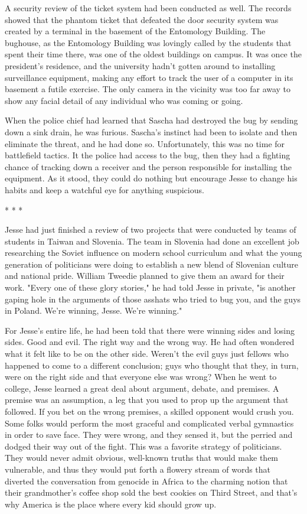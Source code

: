 A security review of the ticket system had been conducted as well.  The records showed that the phantom ticket that defeated the door security system was created by a terminal in the basement of the Entomology Building.  The bughouse, as the Entomology Building was lovingly called by the students that spent their time there, was one of the oldest buildings on campus.  It was once the president's residence, and the university hadn't gotten around to installing surveillance equipment, making any effort to track the user of a computer in its basement a futile exercise.  The only camera in the vicinity was too far away to show any facial detail of any individual who was coming or going.

When the police chief had learned that Sascha had destroyed the bug by sending down a sink drain, he was furious.  Sascha's instinct had been to isolate and then eliminate the threat, and he had done so.  Unfortunately, this was no time for battlefield tactics.  It the police had access to the bug, then they had a fighting chance of tracking down a receiver and the person responsible for installing the equipment.  As it stood, they could do nothing but encourage Jesse to change his habits and keep a watchful eye for anything suspicious.

										* * *

Jesse had just finished a review of two projects that were conducted by teams of students in Taiwan and Slovenia.  The team in Slovenia had done an excellent job researching the Soviet influence on modern school curriculum and what the young generation of politicians were doing to establish a new blend of Slovenian culture and national pride.  William Tweedie planned to give them an award for their work.  "Every one of these glory stories," he had told Jesse in private, "is another gaping hole in the arguments of those asshats who tried to bug you, and the guys in Poland.  We're winning, Jesse.  We're winning."

For Jesse's entire life, he had been told that there were winning sides and losing sides.  Good and evil.  The right way and the wrong way.  He had often wondered what it felt like to be on the other side.  Weren't the evil guys just fellows who happened to come to a different conclusion; guys who thought that they, in turn, were on the right side and that everyone else was wrong?  When he went to college, Jesse learned a great deal about argument, debate, and premises.  A premise was an assumption, a leg that you used to prop up the argument that followed.  If you bet on the wrong premises, a skilled opponent would crush you.  Some folks would perform the most graceful and complicated verbal gymnastics in order to save face.  They were wrong, and they sensed it, but the perried and dodged their way out of the fight.  This was a favorite strategy of politicians.  They would never admit obvious, well-known truths that would make them vulnerable, and thus they would put forth a flowery stream of words that diverted the conversation from genocide in Africa to the charming notion that their grandmother's coffee shop sold the best cookies on Third Street, and that's why America is the place where every kid should grow up.

